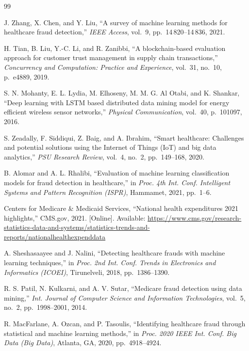 
\begin{thebibliography}{99}

J. Zhang, X. Chen, and Y. Liu,
``A survey of machine learning methods for healthcare fraud detection,''
\textit{IEEE Access},
vol.~9, pp.~14\,820--14\,836, 2021.

H. Tian, B. Liu, Y.-C. Li, and R. Zanibbi,
``A blockchain-based evaluation approach for customer trust management in supply chain transactions,''
\textit{Concurrency and Computation: Practice and Experience},
vol.~31, no.~10, p.~e4889, 2019.

S. N. Mohanty, E. L. Lydia, M. Elhoseny, M. M. G. Al Otabi, and K. Shankar,
``Deep learning with LSTM based distributed data mining model for energy efficient wireless sensor networks,''
\textit{Physical Communication},
vol.~40, p.~101097, 2016.

S. Zeadally, F. Siddiqui, Z. Baig, and A. Ibrahim,
``Smart healthcare: Challenges and potential solutions using the Internet of Things (IoT) and big data analytics,''
\textit{PSU Research Review},
vol.~4, no.~2, pp.~149--168, 2020.

B. Alomar and A. L. Rhalibi,
``Evaluation of machine learning classification models for fraud detection in healthcare,''
in \textit{Proc. 4th Int. Conf. Intelligent Systems and Pattern Recognition (ISPR)},
Hammamet, 2021, pp.~1--6.

Centers for Medicare \& Medicaid Services,
``National health expenditures 2021 highlights,''
CMS.gov, 2021.
[Online]. Available: \url{https://www.cms.gov/research-statistics-data-and-systems/statistics-trends-and-reports/nationalhealthexpenddata}

A. Sheshasaayee and J. Nalini,
``Detecting healthcare frauds with machine learning techniques,''
in \textit{Proc. 2nd Int. Conf. Trends in Electronics and Informatics (ICOEI)},
Tirunelveli, 2018, pp.~1386--1390.

R. S. Patil, N. Kulkarni, and A. V. Sutar,
``Medicare fraud detection using data mining,''
\textit{Int. Journal of Computer Science and Information Technologies},
vol.~5, no.~2, pp.~1998--2001, 2014.

R. MacFarlane, A. Ozcan, and P. Tasoulis,
``Identifying healthcare fraud through statistical and machine learning methods,''
in \textit{Proc. 2020 IEEE Int. Conf. Big Data (Big Data)},
Atlanta, GA, 2020, pp.~4918--4924.


\end{thebibliography}
